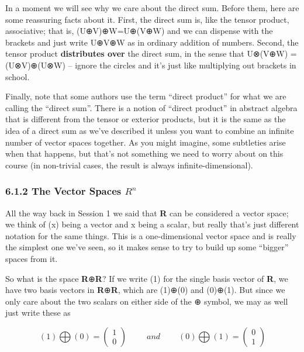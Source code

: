\documentclass[oneside,english]{amsbook}
\numberwithin{section}{chapter}
\theoremstyle{plain}
\theoremstyle{definition}
\begin{document}
In a moment we will see why we care about the direct sum. Before them,
here are some reassuring facts about it. First, the direct sum is, like
the tensor product, associative; that is, (U⊕V)⊕W=U⊕(V⊕W) and we can
dispense with the brackets and just write U⊕V⊕W as in ordinary addition
of numbers. Second, the tensor product \textbf{distributes over} the
direct sum, in the sense that U⊗(V⊕W) = (U⊗V)⊕(U⊗W) -- ignore the
circles and it's just like multiplying out brackets in school.

Finally, note that some authors use the term ``direct product'' for what
we are calling the ``direct sum''. There is a notion of ``direct
product'' in abstract algebra that is different from the tensor or
exterior products, but it is the same as the idea of a direct sum as
we've described it unless you want to combine an infinite number of
vector spaces together. As you might imagine, some subtleties arise when
that happens, but that's not something we need to worry about on this
course (in non-trivial cases, the result is always
infinite-dimensional).

\subsubsection{\texorpdfstring{6.1.2 The Vector Spaces
		\(R^{n}\)}{6.1.2 The Vector Spaces R\^{}\{n\}}}\label{the-vector-spaces-rn}

All the way back in Session 1 we said that \textbf{R} can be considered
a vector space; we think of (x) being a vector and x being a scalar, but
really that's just different notation for the same things. This is a
one-dimensional vector space and is really the simplest one we've seen,
so it makes sense to try to build up some ``bigger'' spaces from it.

So what is the space \textbf{R}⊕\textbf{R}? If we write (1) for the
single basis vector of \textbf{R}, we have two basis vectors in
\textbf{R}⊕\textbf{R}, which are (1)⊕(0) and (0)⊕(1). But since we only
care about the two scalars on either side of the ⊕ symbol, we may as
well just write these as

\[(1)\bigoplus(0) = \begin{pmatrix}
	1 \\
	0
\end{pmatrix}\ \ \ \ \ \ \ \ \ \ \ and\ \ \ \ \ \ \ \ \ \ (0)\bigoplus(1) = \begin{pmatrix}
	0 \\
	1
\end{pmatrix}\]
\end{document}
